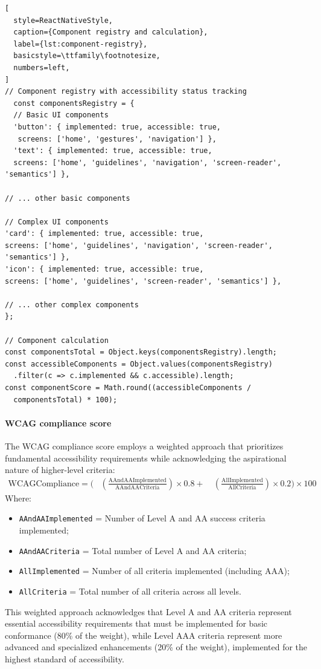 \begin{lstlisting}[
  style=ReactNativeStyle,
  caption={Component registry and calculation},
  label={lst:component-registry},
  basicstyle=\ttfamily\footnotesize,
  numbers=left,
]
// Component registry with accessibility status tracking
  const componentsRegistry = {
  // Basic UI components
  'button': { implemented: true, accessible: true,
   screens: ['home', 'gestures', 'navigation'] },
  'text': { implemented: true, accessible: true,
  screens: ['home', 'guidelines', 'navigation', 'screen-reader', 'semantics'] },
  
// ... other basic components

// Complex UI components
'card': { implemented: true, accessible: true,
screens: ['home', 'guidelines', 'navigation', 'screen-reader', 'semantics'] },
'icon': { implemented: true, accessible: true,
screens: ['home', 'guidelines', 'screen-reader', 'semantics'] },

// ... other complex components
};

// Component calculation
const componentsTotal = Object.keys(componentsRegistry).length;
const accessibleComponents = Object.values(componentsRegistry)
  .filter(c => c.implemented && c.accessible).length;
const componentScore = Math.round((accessibleComponents / 
  componentsTotal) * 100);
\end{lstlisting}

\FloatBarrier

\paragraph{WCAG compliance score}

The WCAG compliance score employs a weighted approach that prioritizes fundamental accessibility requirements while acknowledging the aspirational nature of higher-level criteria:
\begin{align}
\text{WCAGCompliance} = \Bigg(&\left(\frac{\text{AAndAAImplemented}}{\text{AAndAACriteria}}\right) \times 0.8 + \
&\left(\frac{\text{AllImplemented}}{\text{AllCriteria}}\right) \times 0.2\Bigg) \times 100
\end{align}
Where:
\begin{itemize}
\item \texttt{AAndAAImplemented} = Number of Level A and AA success criteria implemented;
\item \texttt{AAndAACriteria} = Total number of Level A and AA criteria;
\item \texttt{AllImplemented} = Number of all criteria implemented (including AAA);
\item \texttt{AllCriteria} = Total number of all criteria across all levels.
\end{itemize}
This weighted approach acknowledges that Level A and AA criteria represent essential accessibility requirements that must be implemented for basic conformance (80\% of the weight), while Level AAA criteria represent more advanced and specialized enhancements (20\% of the weight), implemented for the highest standard of accessibility. 


